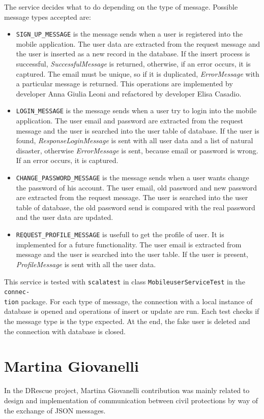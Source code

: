\documentclass[a4paper,12pt]{report}
\begin{document}
The service decides what to do depending on the type of message. Possible message types accepted are:
\begin{itemize}
\item \texttt{SIGN\_UP\_MESSAGE} is the message sends when a user is registered into the mobile application. The user data are extracted from the request message and the user is inserted as a new record in the database. If the insert process is successful, \emph{SuccessfulMessage} is returned, otherwise, if an error occurs, it is captured. The email must be unique, so if it is duplicated, \emph{ErrorMessage} with a particular message is returned. This operations are implemented by developer Anna Giulia Leoni and refactored by developer Elisa Casadio.
\item \texttt{LOGIN\_MESSAGE} is the message sends when a user try to login into the mobile application. The user email and password are extracted from the request message and the user is searched into the user table of database. If the user is found, \emph{ResponseLoginMessage} is sent with all user data and a list of natural disaster, otherwise \emph{ErrorMessage} is sent, because email or password is wrong. If an error occurs, it is captured.
\item \texttt{CHANGE\_PASSWORD\_MESSAGE} is the message sends when a user wants change the password of his account. The user email, old password and new password are extracted from the request message. The user is searched into the user table of database, the old password send is compared with the real password and the user data are updated.
\item \texttt{REQUEST\_PROFILE\_MESSAGE} is usefull to get the profile of user. It is implemented for a future functionality. The user email is extracted from message and the user is searched into the user table. If the user is present, \emph{ProfileMessage} is sent with all the user data.
\end{itemize}

This service is tested with \texttt{scalatest} in class \texttt{MobileuserServiceTest} in the \texttt{connec-\\tion} package. For each type of message, the connection with a local instance of database is opened and operations of insert or update are run. Each test checks if the message type is the type expected. At the end, the fake user is deleted and the connection with database is closed.

\section{Martina Giovanelli}
In the DRescue project, Martina Giovanelli contribution was mainly related to design and implementation of communication between civil protections by way of the exchange of JSON messages.
\end{document}
